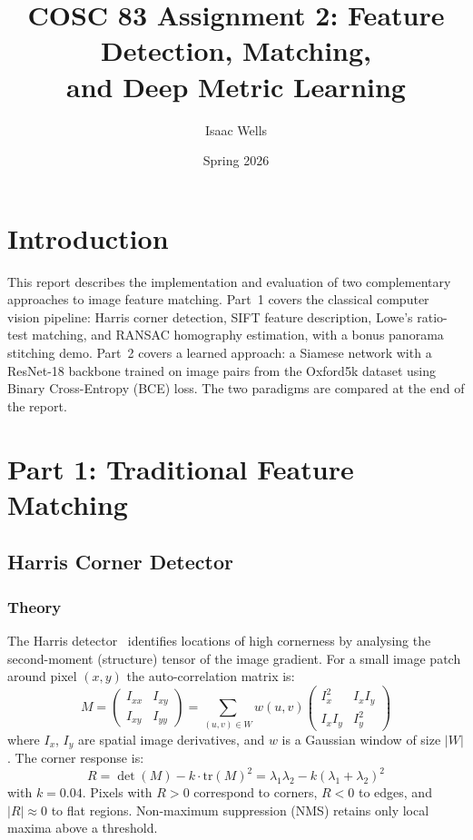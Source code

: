\documentclass[11pt,letterpaper]{article}
\title{\textbf{COSC 83 Assignment 2: Feature Detection, Matching,\\and Deep Metric Learning}}
\author{Isaac Wells}
\date{Spring 2026}
\begin{document}
\maketitle
\tableofcontents
\newpage

\section{Introduction}

This report describes the implementation and evaluation of two complementary approaches to image feature matching. Part~1 covers the classical computer vision pipeline: Harris corner detection, SIFT feature description, Lowe's ratio-test matching, and RANSAC homography estimation, with a bonus panorama stitching demo. Part~2 covers a learned approach: a Siamese network with a ResNet-18 backbone trained on image pairs from the Oxford5k dataset using Binary Cross-Entropy (BCE) loss. The two paradigms are compared at the end of the report.

\section{Part 1: Traditional Feature Matching}

\subsection{Harris Corner Detector}

\subsubsection{Theory}

The Harris detector~\cite{harris1988} identifies locations of high cornerness by analysing the second-moment (structure) tensor of the image gradient. For a small image patch around pixel $(x,y)$ the auto-correlation matrix is:
\[
M = \begin{pmatrix} I_{xx} & I_{xy} \\ I_{xy} & I_{yy} \end{pmatrix}
  = \sum_{(u,v)\in W} w(u,v)
    \begin{pmatrix} I_x^2 & I_xI_y \\ I_xI_y & I_y^2 \end{pmatrix}
\]
where $I_x$, $I_y$ are spatial image derivatives, and $w$ is a Gaussian window of size $|W|$. The corner response is:
\[
R = \det(M) - k \cdot \mathrm{tr}(M)^2
    = \lambda_1\lambda_2 - k(\lambda_1+\lambda_2)^2
\]
with $k = 0.04$. Pixels with $R > 0$ correspond to corners, $R < 0$ to edges, and $|R| \approx 0$ to flat regions. Non-maximum suppression (NMS) retains only local maxima above a threshold.
\end{document}

